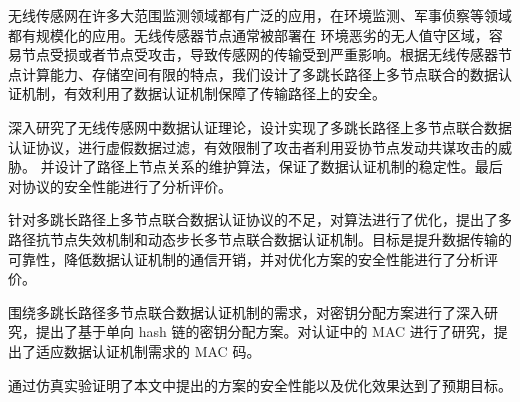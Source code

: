 \begin{cabstract}
无线传感网在许多大范围监测领域都有广泛的应用，在环境监测、军事侦察等领域都有规模化的应用。无线传感器节点通常被部署在
环境恶劣的无人值守区域，容易节点受损或者节点受攻击，导致传感网的传输受到严重影响。根据无线传感器节点计算能力、存储空间有限的特点，我们设计了多跳长路径上多节点联合的数据认证机制，有效利用了数据认证机制保障了传输路径上的安全。

深入研究了无线传感网中数据认证理论，设计实现了多跳长路径上多节点联合数据认证协议，进行虚假数据过滤，有效限制了攻击者利用妥协节点发动共谋攻击的威胁。
并设计了路径上节点关系的维护算法，保证了数据认证机制的稳定性。最后对协议的安全性能进行了分析评价。

针对多跳长路径上多节点联合数据认证协议的不足，对算法进行了优化，提出了多路径抗节点失效机制和动态步长多节点联合数据认证机制。目标是提升数据传输的可靠性，降低数据认证机制的通信开销，并对优化方案的安全性能进行了分析评价。

围绕多跳长路径多节点联合数据认证机制的需求，对密钥分配方案进行了深入研究，提出了基于单向 hash 链的密钥分配方案。对认证中的 MAC 进行了研究，提出了适应数据认证机制需求的 MAC 码。

通过仿真实验证明了本文中提出的方案的安全性能以及优化效果达到了预期目标。

\end{cabstract}

